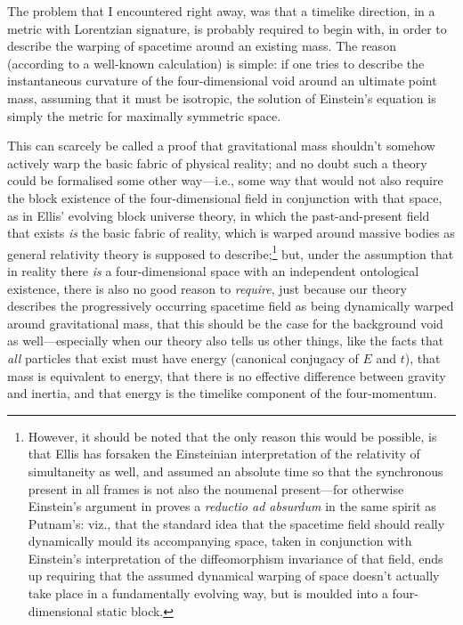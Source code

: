 The problem that I encountered right away, was that a timelike direction, in a metric with Lorentzian signature, is probably required to begin with, in order to describe the warping of spacetime around an existing mass. The reason (according to a well-known calculation) is simple: if one tries to describe the instantaneous curvature of the four-dimensional void around an ultimate point mass, assuming that it must be isotropic, the solution of Einstein's equation is simply the metric for maximally symmetric space. 

This can scarcely be called a proof that gravitational mass shouldn't somehow actively warp the basic fabric of physical reality; and no doubt such a theory could be formalised some other way---i.e., some way that would not also require the block existence of the four-dimensional field in conjunction with that space, as in Ellis' evolving block universe theory, in which the past-and-present field that exists \textit{is} the basic fabric of reality, which is warped around massive bodies as general relativity theory is supposed to describe;\footnote{However, it should be noted that the only reason this would be possible, is that Ellis has forsaken the Einsteinian interpretation of the relativity of simultaneity as well, and assumed an absolute time so that the synchronous present in all frames is not also the noumenal present---for otherwise Einstein's argument in \cite{Einstein2001} proves a \textit{reductio ad absurdum} in the same spirit as Putnam's: viz., that the standard idea that the spacetime field should really dynamically mould its accompanying space, taken in conjunction with Einstein's interpretation of the diffeomorphism invariance of that field, ends up requiring that the assumed dynamical warping of space doesn't actually take place in a fundamentally evolving way, but is moulded into a four-dimensional static block.} but, under the assumption that in reality there \textit{is} a four-dimensional space with an independent ontological existence, there is also no good reason to \textit{require}, just because our theory describes the progressively occurring spacetime field as being dynamically warped around gravitational mass, that this should be the case for the background void as well---especially when our theory also tells us other things, like the facts that \textit{all} particles that exist must have energy (canonical conjugacy of $E$ and $t$), that mass is equivalent to energy, that there is no effective difference between gravity and inertia, and that energy is the timelike component of the four-momentum.

